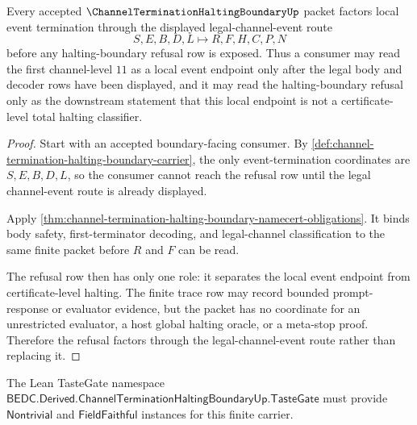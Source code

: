 \begin{theorem}
\label{thm:channel-termination-halting-boundary-refusal-factorization}
Every accepted $\ChannelTerminationHaltingBoundaryUp$ packet factors local event termination through the displayed legal-channel-event route
$$
S,E,B,D,L \longmapsto R,F,H,C,P,N
$$
before any halting-boundary refusal row is exposed. Thus a consumer may read the first channel-level $11$ as a local event endpoint only after the legal body and decoder rows have been displayed, and it may read the halting-boundary refusal only as the downstream statement that this local endpoint is not a certificate-level total halting classifier.
\end{theorem}
\begin{proof}
Start with an accepted boundary-facing consumer. By \autoref{def:channel-termination-halting-boundary-carrier}, the only event-termination coordinates are $S,E,B,D,L$, so the consumer cannot reach the refusal row until the legal channel-event route is already displayed.

Apply \autoref{thm:channel-termination-halting-boundary-namecert-obligations}. It binds body safety, first-terminator decoding, and legal-channel classification to the same finite packet before $R$ and $F$ can be read.

The refusal row then has only one role: it separates the local event endpoint from certificate-level halting. The finite trace row may record bounded prompt-response or evaluator evidence, but the packet has no coordinate for an unrestricted evaluator, a host global halting oracle, or a meta-stop proof. Therefore the refusal factors through the legal-channel-event route rather than replacing it.
\end{proof}



The Lean TasteGate namespace $\mathsf{BEDC.Derived.ChannelTerminationHaltingBoundaryUp.TasteGate}$ must provide $\mathsf{Nontrivial}$ and $\mathsf{FieldFaithful}$ instances for this finite carrier.

